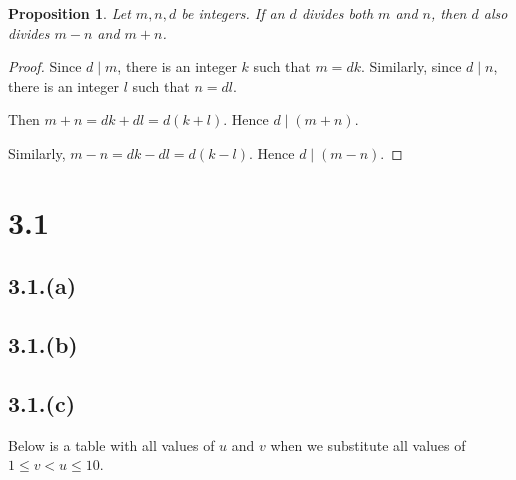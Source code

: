 \documentclass[letterpaper, 12pt]{article}
\theoremstyle{mystyle}
\newtheorem*{prop}{Proposition}
\begin{document}
\begin{prop}
    Let $m,n, d$ be integers. If an $d$ divides both $m$ and $n$, then $d$ also
    divides $m-n$ and $m+n$.
\end{prop}

\begin{proof}
    Since $d \mid m$, there is an integer $k$ such that $m = dk$. Similarly,
    since $d \mid n$, there is an integer $l$ such that $n = dl$.
    
    Then $m+n = dk+dl = d(k+l)$. Hence $d \mid (m+n)$.
    
    Similarly, $m-n = dk-dl = d(k-l)$. Hence $d \mid (m-n)$.
\end{proof}


\section*{3.1}

\subsection*{3.1.(a)}

\subsection*{3.1.(b)}

\subsection*{3.1.(c)}
Below is a table with all values of $u$ and $v$ when we substitute all values
of ${1 \leq v < u \leq 10}$.
\end{document}
